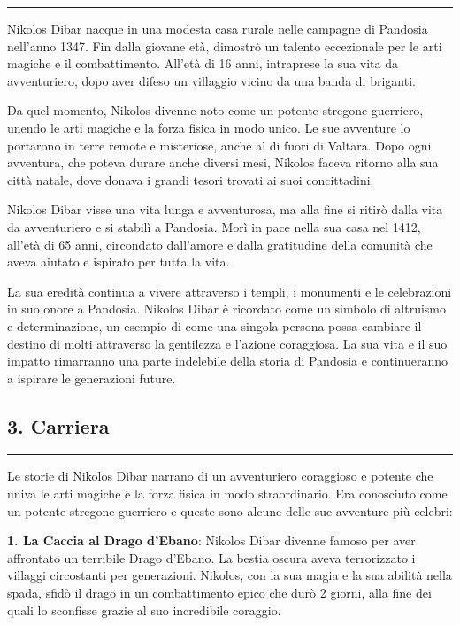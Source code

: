 \begin{center}\rule{0.5\linewidth}{0.5pt}\end{center}

Nikolos Dibar nacque in una modesta casa rurale nelle campagne di
\href{Pandosia\%2028129d9d5ac7448d98387dc4262c4704.md}{Pandosia}
nell'anno 1347. Fin dalla giovane età, dimostrò un talento eccezionale
per le arti magiche e il combattimento. All'età di 16 anni, intraprese
la sua vita da avventuriero, dopo aver difeso un villaggio vicino da una
banda di briganti.

Da quel momento, Nikolos divenne noto come un potente stregone
guerriero, unendo le arti magiche e la forza fisica in modo unico. Le
sue avventure lo portarono in terre remote e misteriose, anche al di
fuori di Valtara. Dopo ogni avventura, che poteva durare anche diversi
mesi, Nikolos faceva ritorno alla sua città natale, dove donava i grandi
tesori trovati ai suoi concittadini.

Nikolos Dibar visse una vita lunga e avventurosa, ma alla fine si ritirò
dalla vita da avventuriero e si stabilì a Pandosia. Morì in pace nella
sua casa nel 1412, all'età di 65 anni, circondato dall'amore e dalla
gratitudine della comunità che aveva aiutato e ispirato per tutta la
vita.

La sua eredità continua a vivere attraverso i templi, i monumenti e le
celebrazioni in suo onore a Pandosia. Nikolos Dibar è ricordato come un
simbolo di altruismo e determinazione, un esempio di come una singola
persona possa cambiare il destino di molti attraverso la gentilezza e
l'azione coraggiosa. La sua vita e il suo impatto rimarranno una parte
indelebile della storia di Pandosia e continueranno a ispirare le
generazioni future.

\subsection{3. Carriera}\label{carriera}

\begin{center}\rule{0.5\linewidth}{0.5pt}\end{center}

Le storie di Nikolos Dibar narrano di un avventuriero coraggioso e
potente che univa le arti magiche e la forza fisica in modo
straordinario. Era conosciuto come un potente stregone guerriero e
queste sono alcune delle sue avventure più celebri:

\textbf{1. La Caccia al Drago d'Ebano}: Nikolos Dibar divenne famoso per
aver affrontato un terribile Drago d'Ebano. La bestia oscura aveva
terrorizzato i villaggi circostanti per generazioni. Nikolos, con la sua
magia e la sua abilità nella spada, sfidò il drago in un combattimento
epico che durò 2 giorni, alla fine dei quali lo sconfisse grazie al suo
incredibile coraggio.

